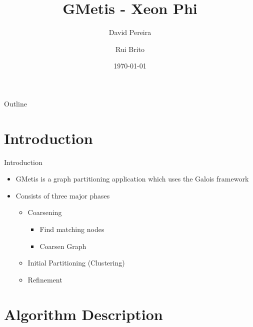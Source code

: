 \documentclass{beamer}
\title{
    GMetis - Xeon Phi
}
\author{
    David Pereira
    \and
    Rui Brito
}
\date{\today}
\begin{document}
\begin{frame}
  \titlepage
\end{frame}

\begin{frame}{Outline}
  \tableofcontents
\end{frame}



\section{Introduction}

\begin{frame}{Introduction}
\begin{itemize}
    \item GMetis is a graph partitioning application which uses the Galois
      framework
    \item Consists of three major phases
      \begin{itemize}
        \item Coarsening
        \begin{itemize}
          \item Find matching nodes
          \item Coarsen Graph
        \end{itemize}
        \item Initial Partitioning (Clustering)
        \item Refinement
      \end{itemize}
\end{itemize}
\end{frame}



\section{Algorithm Description}
\end{document}
